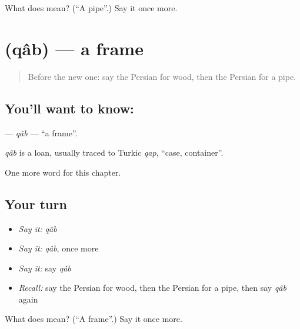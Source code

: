 \begin{tcolorbox}[breakable,colback=teal!4,colframe=teal!35!black,title={Before you move on}]
What does  mean? (\textquotedblleft{}A pipe\textquotedblright{}.) Say it once more.
\end{tcolorbox}
\section[\texorpdfstring{\fa{قاب} (qâb)}{قاب (qâb)}]{ (qâb) — a frame}

\label{lesson:FA-C282-qab}



\begin{quote}
Before the new one: say the Persian for wood, then the Persian for a pipe.
\end{quote}

\subsection*{You'll want to know: }
\textbf{} — \emph{qâb} — \textquotedblleft{}a frame\textquotedblright{}.

\begin{cousinweb}
\emph{qâb} is a loan, usually traced to Turkic \emph{qap}, \textquotedblleft{}case, container\textquotedblright{}.
\end{cousinweb}

\begin{grammarlens}[title={What you've built}]
One more word for this chapter.
\end{grammarlens}

\subsection*{Your turn}
\begin{itemize}
\raggedright
  \item \emph{Say it:} \emph{qâb}
  \item \emph{Say it:} \emph{qâb}, once more
  \item \emph{Say it:} say \emph{qâb}
  \item \emph{Recall:} say the Persian for wood, then the Persian for a pipe, then say \emph{qâb} again
\end{itemize}

\begin{tcolorbox}[breakable,colback=teal!4,colframe=teal!35!black,title={Before you move on}]
What does  mean? (\textquotedblleft{}A frame\textquotedblright{}.) Say it once more.
\end{tcolorbox}

